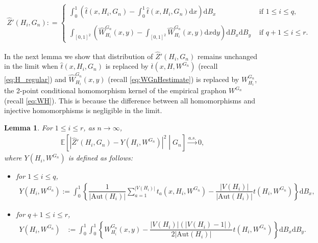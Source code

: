 \documentclass[11pt,reqno]{amsart}
\numberwithin{equation}{section}
\newcommand{\E}{\mathbb{E}}
\newcommand{\ra}{\rightarrow}
\newtheorem{lemma}{Lemma}[section]
\theoremstyle{definition}
\begin{document}
\begin{align*}
    \hat Z'(H_{i}, G_{n}) : = 
    \begin{cases}
      \int_0^1 \left( \hat t( x , H_i, G_n) -  \int_0^ 1 \hat t( x , H_i, G_n) \mathrm d  x\right) \mathrm dB_x  & \text{ if }  1 \leq i \leq q, \\ \\ 
  \int_{[0,1]^2 }  \left( \hat W^{G_n}_{H_i}(x, y) - \int_{[0, 1]^2} \hat W^{G_n}_{H_i}(x, y) \mathrm d x \mathrm d y \right) \mathrm d B_x \mathrm d B_y & \text{ if } q+1 \leq i \leq  r . 
    \end{cases}
\end{align*}

In the next lemma we show that distribution of $ \hat Z'(H_{i}, G_{n})$ remains unchanged in the limit when $\hat t( x , H_i, G_n)$ is replaced by $\overline{t}(x,H,W^{G_n})$ (recall \eqref{eq:H_regular}) and $\hat W^{G_n}_{H_i}(x, y)$ (recall \eqref{eq:WGnHestimate}) is replaced by $W^{G_n}_{H_{i}}$, the 2-point conditional homomorphism kernel of the empirical graphon $W^{G_n}$ (recall \eqref{eq:WH}).
This is because the difference between all homomorphisms and injective homomorphisms is negligible in the limit. 


\begin{lemma}\label{lm:ZHGndistribution} For $1 \leq i \leq r$, as $n \rightarrow \infty$, 
  \begin{align}\label{eq:ZhatprimeYdiffo1}
        \E\left[\left|\hat Z'(H_i,G_n) - Y(H_i,W^{G_n})\right|^2\middle| G_n\right] \stackrel{a.s.}{\ra} 0 ,  
    \end{align}
where $Y(H_i, W^{G_{n}})$ is defined as follows: 
\begin{itemize}
\item for  $1 \leq i \leq q$, 
\begin{align*}
  Y(H_i, W^{G_{n}}):= \int_{0}^{1} \left\{ \dfrac{1}{|\mathrm{Aut}(H_{i})|}\sum_{a=1}^{|V(H_{i})|}t_{a}(x,H_{i},W^{G_{n}}) - \dfrac{|V(H_{i})|}{|\mathrm{Aut}(H_{i})|}t(H_{i},W^{G_{n}}) \right\} \mathrm d B_{x} , 
\end{align*} 
\item for $q+1\leq i\leq  r$, 
\begin{align*}
    Y(H_i, W^{G_{n}})    & := \int_{0}^{1}\int_{0}^{1} \left\{ W^{G_n}_{H_{i}}(x,y) - \dfrac{|V(H_{i})|\left(|V(H_{i})-1|\right)}{2|\mathrm{Aut}(H_{i})|}t(H_{i},W^{G_{n}}) \right\} \mathrm d B_{x}\mathrm d B_{y} . 
\end{align*}
\end{itemize}
\end{lemma}
\end{document}
